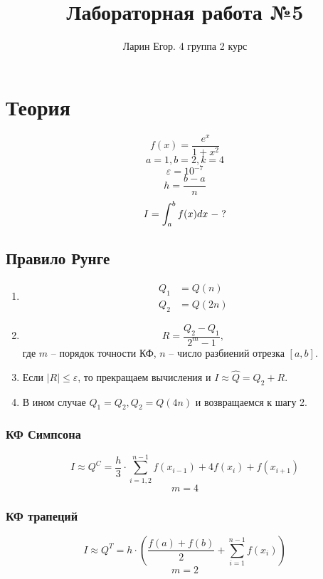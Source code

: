 \documentclass{article}
\title{Лабораторная работа №5}
\author{Ларин Егор. 4 группа 2 курс}
\begin{document}
\maketitle
\section*{Теория}
\[f(x) = \frac{e^x}{1+x^2}\]
\[a = 1, b =2, k = 4\]
\[ \boxed{\varepsilon = 10 ^{-7}}\]
\[h = \frac{b-a}{n}\]
\[I = \int_a^b f(x)dx \hspace{0.1cm} - \hspace{0.1cm} ? \]
\subsection*{Правило Рунге}
\begin{enumerate}
\item \begin{equation*}
    \begin{split}
        Q_1 &= Q(n) \\
        Q_2 &= Q(2n)
    \end{split}
\end{equation*}
\item \[R = \frac{Q_2 - Q_1} {2^m -1},\]
где $m$ -- порядок точности КФ, $n$ -- число разбиений отрезка $\left[a, b\right]$.
    \item Если $\left| R\right| \leq \varepsilon $, то прекращаем вычисления и $I \approx \hat{Q} = Q_2 + R$.
    \item В ином случае $Q_1 = Q_2, Q_2 = Q(4n)$ и возвращаемся к шагу 2.
\end{enumerate} 
\subsubsection*{КФ Симпсона}
\[
I \approx Q^C = \frac{h}{3} \cdot \sum_{i=1,2}^{n-1} f(x_{i-1}) + 4 f(x_i) + f(x_{i+1})
\]
\[m=4\]
\subsubsection*{КФ трапеций}
\[
I \approx Q^T = h \cdot \left(\frac{f(a) + f(b)}{2} + \sum_{i=1}^{n-1} f(x_i)  \right)
\]
\[m=2\]
\end{document}
